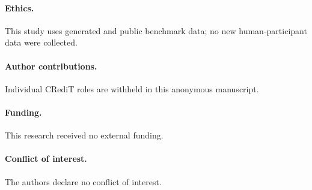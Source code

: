 \documentclass[runningheads]{llncs}
\begin{document}
\paragraph{Ethics.} This study uses generated and public benchmark data; no new human-participant data were collected.
\paragraph{Author contributions.} Individual CRediT roles are withheld in this anonymous manuscript.
\paragraph{Funding.} This research received no external funding.
\paragraph{Conflict of interest.} The authors declare no conflict of interest.



\end{document}
